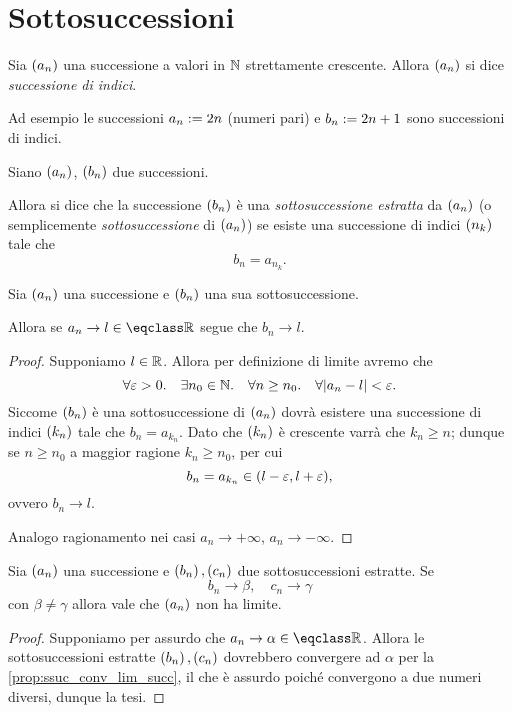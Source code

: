 \section{Sottosuccessioni}

\begin{definition}
     \label{def:succ_indici}
    Sia $\seqn*{a}$ una successione a valori in $\mathbb{N}$ strettamente crescente. Allora $\seqn*{a}$ si dice \emph{successione di indici}.
\end{definition}

Ad esempio le successioni $a_n := 2n$ (numeri pari) e $b_n := 2n + 1$ sono successioni di indici.

\begin{definition}
     \label{def:sottosucc}
    Siano $\seqn*{a}$, $\seqn*{b}$ due successioni.

    Allora si dice che la successione $\seqn*{b}$ è una \emph{sottosuccessione estratta} da $\seqn*{a}$ (o semplicemente \emph{sottosuccessione} di $\seqn*{a}$) se esiste una successione di indici $\seqn*[k]{n}$ tale che \[
        b_n = a_{n_k}.    
    \]
\end{definition}

\begin{proposition}
     \label{prop:ssuc_conv_lim_succ}
    Sia $\seqn*{a}$ una successione e $\seqn*[n]{b}$ una sua sottosuccessione.

    Allora se $a_n \to l \in \closure{\R}$ segue che $b_{n} \to l$.
\end{proposition}
\begin{proof}
    Supponiamo $l \in \mathbb{R}$. Allora per definizione di limite avremo che \[
        \forall \eps > 0. \quad \exists n_0 \in \N. \quad \forall n \geq n_0. \quad \forall \abs*{a_n - l} < \eps.
    \] Siccome $\seqn*{b}$ è una sottosuccessione di $\seqn*{a}$ dovrà esistere una successione di indici $\seqn*{k}$ tale che $b_n = a_{k_n}$. Dato che $\seqn*{k}$ è crescente varrà che $k_n \geq n$; dunque se $n \geq n_0$ a maggior ragione $k_n \geq n_0$, per cui \[
        b_n = a_{k_n} \in (l - \varepsilon, l+\varepsilon),    
    \] ovvero $b_n \to l$.

    Analogo ragionamento nei casi $a_n \to +\infty$, $a_n \to -\infty$.
\end{proof}

\begin{corollary}
    Sia $\seqn*{a}$ una successione e $\seqn*{b}, \seqn*{c}$ due sottosuccessioni estratte. Se \[
        b_n \to \beta, \quad c_n \to \gamma     
    \] con $\beta \neq \gamma$ allora vale che $\seqn*{a}$ non ha limite.
\end{corollary}
\begin{proof}
    Supponiamo per assurdo che $a_n \to \alpha \in \closure{\R}$. Allora le sottosuccessioni estratte $\seqn*{b}, \seqn*{c}$ dovrebbero convergere ad $\alpha$ per la \autoref{prop:ssuc_conv_lim_succ}, il che è assurdo poiché convergono a due numeri diversi, dunque la tesi.
\end{proof}